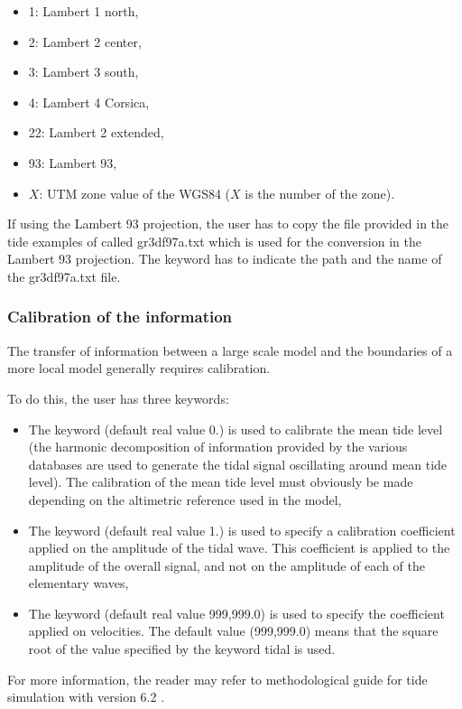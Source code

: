 \begin{itemize}
\item 1: Lambert 1 north,

\item 2: Lambert 2 center,

\item 3: Lambert 3 south,

\item 4: Lambert 4 Corsica,

\item 22: Lambert 2 extended,

\item 93: Lambert 93,

\item $X$: UTM zone value of the WGS84 ($X$ is the number of the
zone).
\end{itemize}

If using the Lambert 93 projection, the user has to copy the file provided
in the tide examples of  called gr3df97a.txt which is used
for the conversion in the Lambert 93 projection.
The keyword  has to indicate the path
and the name of the gr3df97a.txt file.

\subsubsection{Calibration of the information}

The transfer of information between a large scale model and the boundaries of
a more local model generally requires calibration.

To do this, the user has three keywords:

\begin{itemize}
\item The keyword  (default real
value 0.) is used to calibrate the mean tide level (the harmonic decomposition
of information provided by the various databases are used to generate the tidal
signal oscillating around mean tide level). The calibration of the mean tide
level must obviously be made depending on the altimetric reference used in the
model,

\item The keyword  (default real
value 1.) is used to specify a calibration coefficient applied on the
amplitude of the tidal wave. This coefficient is applied to the amplitude of
the overall signal, and not on the amplitude of each of the elementary waves,

\item The keyword  (default
real value 999,999.0) is used to specify the coefficient applied on velocities.
The default value (999,999.0) means that the square root of the value
specified by the keyword  tidal is
used.
\end{itemize}

For more information, the reader may refer to methodological guide for tide
simulation with version 6.2 \cite{Pham2012}.
